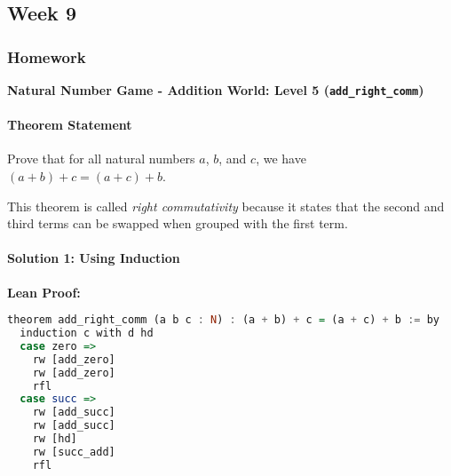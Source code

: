 \documentclass{article}
\theoremstyle{theorem}
\theoremstyle{definition}
\theoremstyle{remark}
\begin{document}
\subsection{Week 9}
\subsubsection{Homework}

\textbf{Natural Number Game - Addition World: Level 5 (\texttt{add\_right\_comm})}

\paragraph{Theorem Statement}
Prove that for all natural numbers $a$, $b$, and $c$, we have $(a + b) + c = (a + c) + b$.

This theorem is called \textit{right commutativity} because it states that the second and third terms can be swapped when grouped with the first term.

\paragraph{Solution 1: Using Induction}

\textbf{Lean Proof:}
\begin{lstlisting}[language=haskell]
theorem add_right_comm (a b c : N) : (a + b) + c = (a + c) + b := by
  induction c with d hd
  case zero =>
    rw [add_zero]
    rw [add_zero]
    rfl
  case succ =>
    rw [add_succ]
    rw [add_succ]
    rw [hd]
    rw [succ_add]
    rfl
\end{lstlisting}
\end{document}

